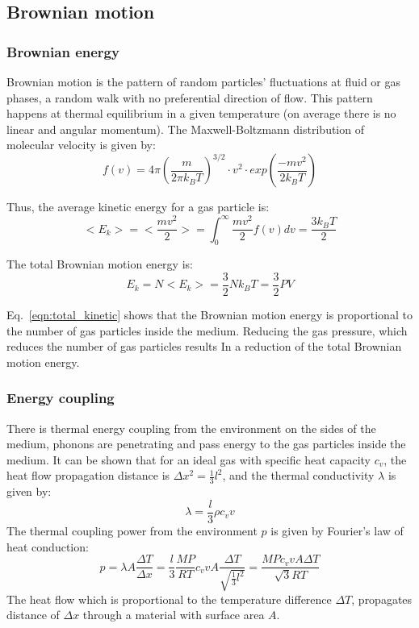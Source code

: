 \documentclass[\main/master.tex]{subfiles}
\begin{document}
\subsection{Brownian motion}
\subsubsection{Brownian energy}
Brownian motion is the pattern of random particles' fluctuations at fluid or gas phases, a random walk with no preferential direction of flow. This pattern happens at thermal equilibrium in a given temperature (on average there is no linear and angular momentum). The Maxwell-Boltzmann distribution of molecular velocity is given by:
\begin{equation}
f(v) = 4\pi(\frac{m}{2 \pi k_B T})^{3/2}\cdot v^2\cdot exp(\frac{-mv^2}{2k_BT})     \label{eqn:Maxwell_Boltzmann}
\end{equation} 
\par\noindent 
Thus, the average kinetic energy for a gas particle is: 
\begin{equation}
<E_k>=<\frac{mv^2}{2}> = \int_{0}^{\infty}\frac{mv^2}{2}f(v)dv =  \frac{3k_BT}{2}    \label{eqn:average kinetic}
\end{equation}
\par\noindent
The total Brownian motion energy is:
\begin{equation}
E_k = N<E_k> =\frac{3}{2}N k_B T = \frac{3}{2}PV    \label{eqn:total_kinetic}
\end{equation}
\par\noindent
Eq.~\ref{eqn:total_kinetic} shows that the Brownian motion energy is proportional to the number of gas particles inside the medium. Reducing the gas pressure, which reduces the number of gas particles results In a reduction of the total Brownian motion energy. 
\subsubsection{Energy coupling}
There is thermal energy coupling from the environment on the sides of the medium, phonons are penetrating and pass energy to the gas particles inside the medium. It can be shown that for an ideal gas with specific heat capacity $c_v$, the heat flow propagation distance is $\Delta x ^2  = \frac{1}{3} l^2 $, and the thermal conductivity $\lambda$ is given by:
\begin{equation}
\lambda  = \frac{l}{3}\rho c_v v    \label{eqn:heat conduction coefficient}
\end{equation}
The thermal coupling power from the environment $p$ is given by Fourier's law of heat conduction:
\begin{equation}
p =  \lambda A \frac{\Delta T}{\Delta x} =\frac{l}{3} \frac{MP}{RT} c_v v A \frac{\Delta T}{\sqrt{\frac{1}{3} l^2 }} = \frac{M P c_v v A \Delta T}{\sqrt{3}RT}     
\label{eqn:heat conduction}
\end{equation}
The heat flow which is proportional to the temperature difference $\Delta T$, propagates distance of $\Delta x$ through a material with surface area $A$.
\end{document}
